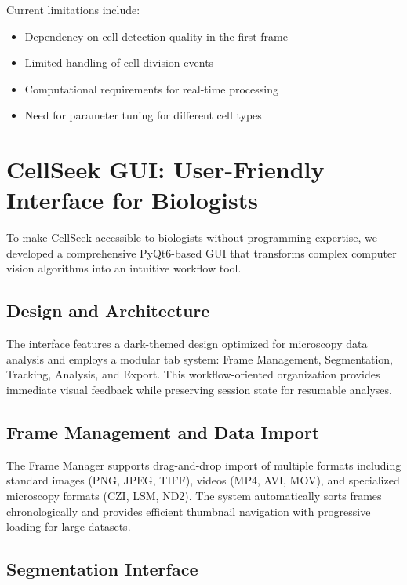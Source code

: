 \documentclass[12pt]{article}
\begin{document}
Current limitations include:
\begin{itemize}
  \item Dependency on cell detection quality in the first frame
  \item Limited handling of cell division events
  \item Computational requirements for real-time processing
  \item Need for parameter tuning for different cell types
\end{itemize}

\section{CellSeek GUI: User-Friendly Interface for Biologists}


To make CellSeek accessible to biologists without programming expertise, we developed a comprehensive PyQt6-based GUI that transforms complex computer vision algorithms into an intuitive workflow tool.

\subsection{Design and Architecture}

The interface features a dark-themed design optimized for microscopy data analysis and employs a modular tab system: Frame Management, Segmentation, Tracking, Analysis, and Export. This workflow-oriented organization provides immediate visual feedback while preserving session state for resumable analyses.

\subsection{Frame Management and Data Import}

The Frame Manager supports drag-and-drop import of multiple formats including standard images (PNG, JPEG, TIFF), videos (MP4, AVI, MOV), and specialized microscopy formats (CZI, LSM, ND2). The system automatically sorts frames chronologically and provides efficient thumbnail navigation with progressive loading for large datasets.

\subsection{Segmentation Interface}
\end{document}
